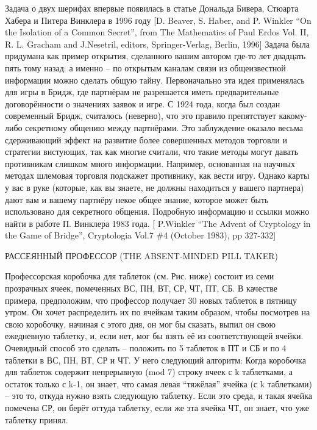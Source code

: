    Задача о двух шерифах впервые появилась в статье Дональда Бивера, Стюарта Хабера и Питера Винклера в 1996 году [D. Beaver, S. Haber, and P. Winkler “On the Isolation of a Common Secret”, from The Mathematics of Paul Erdos Vol. II, R. L. Gracham and J.Nesetril, editors, Springer-Verlag, Berlin, 1996] Задача была придумана как пример открытия, сделанного вашим автором где-то лет двадцать пять тому назад: а именно --  по открытым каналам связи из общеизвестной информации можно сделать общую тайну. Первоначально эта идея применялась для игры в Бридж, где партнёрам не разрешается иметь предварительные договорённости о значениях заявок и игре. С 1924 года, когда был создан современный Бридж, считалось (неверно), что это правило препятствует какому-либо секретному общению между партнёрами. Это заблуждение оказало весьма сдерживающий эффект на развитие более совершенных методов торговли и стратегии вистующих, так как многие считали, что такие методы могут давать противникам слишком много информации. Например, основанная на научных методах шлемовая торговля подскажет противнику, как вести игру.
   Однако карты у вас в руке (которые, как вы знаете, не должны находиться у вашего партнера) дают вам и вашему партнёру некое общее знание, которое  может быть использовано для секретного общения. Подробную информацию и ссылки можно найти в работе П. Винклера 1983 года. [ P.Winkler “The Advent of Cryptology in the Game of Bridge”, Cryptologia Vol.7 \#4 (October 1983), pp 327-332]




РАССЕЯННЫЙ ПРОФЕССОР (THE ABSENT-MINDED PILL TAKER)


  Профессорская коробочка для таблеток (см. Рис. ниже) состоит из семи прозрачных ячеек, помеченных ВС, ПН, ВТ, СР, ЧТ, ПТ, СБ.  В качестве примера, предположим, что профессор получает 30 новых таблеток в пятницу утром. Он хочет распределить их по ячейкам таким образом, чтобы посмотрев на свою коробочку, начиная с этого дня, он мог бы сказать, выпил он свою ежедневную таблетку, и, если нет, мог бы взять её из соответствующей ячейки.
  Очевидный способ это сделать -- положить по 5 таблеток в ПТ и СБ и по 4 таблетки в ВС, ПН, ВТ, СР и ЧТ.  У него следующий алгоритм:
     Когда коробочка для таблеток содержит непрерывную (mod 7) строку ячеек с k таблетками, а остаток только с k-1,  он знает, что самая левая “тяжёлая” ячейка (с k таблетками) -- это то, откуда нужно взять следующую таблетку. Если это среда, и такая ячейка помечена СР, он берёт оттуда таблетку, если же эта ячейка ЧТ, он знает, что уже таблетку принял.


